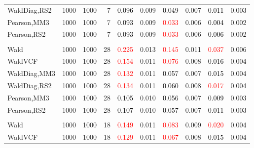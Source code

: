 \documentclass[
]{article}
\begin{document}
\begin{table}[H]
{\begin{tabular}[t]{lrrrrrrlrr}
\hspace{1em}WaldDiag,RS2 & 1000 & 1000 & 7 & \textcolor{black}{0.096} & 0.009 & \textcolor{black}{0.049} & 0.007 & \textcolor{black}{0.011} & 0.003\\
\hspace{1em}Pearson,MM3 & 1000 & 1000 & 7 & \textcolor{black}{0.093} & 0.009 & \textcolor{red}{0.033} & 0.006 & \textcolor{black}{0.004} & 0.002\\
\hspace{1em}Pearson,RS2 & 1000 & 1000 & 7 & \textcolor{black}{0.093} & 0.009 & \textcolor{red}{0.033} & 0.006 & \textcolor{black}{0.006} & 0.002\\
\addlinespace[0.3em]
\multicolumn{10}{l}{\textbf{1F 15V}}\\
\hspace{1em}Wald & 1000 & 1000 & 28 & \textcolor{red}{0.225} & 0.013 & \textcolor{red}{0.145} & 0.011 & \textcolor{red}{0.037} & 0.006\\
\hspace{1em}WaldVCF & 1000 & 1000 & 28 & \textcolor{red}{0.154} & 0.011 & \textcolor{red}{0.076} & 0.008 & \textcolor{black}{0.016} & 0.004\\
\hspace{1em}WaldDiag,MM3 & 1000 & 1000 & 28 & \textcolor{red}{0.132} & 0.011 & \textcolor{black}{0.057} & 0.007 & \textcolor{black}{0.015} & 0.004\\
\hspace{1em}WaldDiag,RS2 & 1000 & 1000 & 28 & \textcolor{red}{0.134} & 0.011 & \textcolor{black}{0.060} & 0.008 & \textcolor{red}{0.017} & 0.004\\
\hspace{1em}Pearson,MM3 & 1000 & 1000 & 28 & \textcolor{black}{0.105} & 0.010 & \textcolor{black}{0.056} & 0.007 & \textcolor{black}{0.009} & 0.003\\
\hspace{1em}Pearson,RS2 & 1000 & 1000 & 28 & \textcolor{black}{0.107} & 0.010 & \textcolor{black}{0.057} & 0.007 & \textcolor{black}{0.011} & 0.003\\
\addlinespace[0.3em]
\multicolumn{10}{l}{\textbf{2F 10V}}\\
\hspace{1em}Wald & 1000 & 1000 & 18 & \textcolor{red}{0.149} & 0.011 & \textcolor{red}{0.083} & 0.009 & \textcolor{red}{0.020} & 0.004\\
\hspace{1em}WaldVCF & 1000 & 1000 & 18 & \textcolor{red}{0.129} & 0.011 & \textcolor{red}{0.067} & 0.008 & \textcolor{black}{0.015} & 0.004\\

\end{tabular}}
\end{table}
\end{document}
